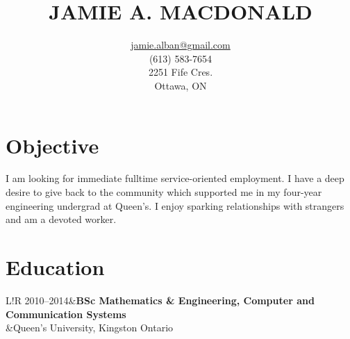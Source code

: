 \documentclass[10pt]{article}
\title{JAMIE A. MACDONALD}
\author{\href{mailto:jamie.alban@gmail.com}{jamie.alban@gmail.com}\\(613) 583-7654\\2251 Fife Cres.\\Ottawa, ON}
\date{}
\newcommand\VRule{\color{lightgray}\vrule width 0.5pt}
\begin{document}
\begin{minipage}{0.2\textwidth}
\hspace{0em}
\end{minipage}
\begin{minipage}{0.55\textwidth}
\vspace{-3em}
\maketitle
\end{minipage}
\begin{minipage}{0.25\textwidth}
\end{minipage}
\thispagestyle{fancy}
\vspace{-3em}
\section*{Objective}
I am looking for immediate fulltime service-oriented employment. I have a deep desire to give back to the community which supported me in my four-year engineering undergrad at Queen's. I enjoy sparking relationships with strangers and am a devoted worker.
\vspace{-1em}
\section*{Education}
\begin{tabular}{L!{\VRule}R}
2010--2014&{\bf BSc Mathematics \& Engineering, Computer and Communication Systems}\\
          &{Queen's University, Kingston Ontario}\\
\end{tabular}
\vspace{-1em}
\end{document}
